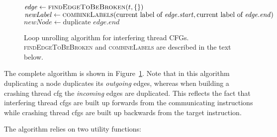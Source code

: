 \begin{figure}
\begin{algorithmic}
       \State $\mathit{edge} \gets \textsc{findEdgeToBeBroken}(t, \{\})$
       \State $\mathit{newLabel} \gets \textsc{combineLabels}(\text{current label of } \mathit{edge}.\mathit{start}, \text{current label of } \mathit{edge}.\mathit{end})$
       \Else
           \State $\mathit{newNode} \gets \text{duplicate } \mathit{edge}.\mathit{end}$
           \EndFor
       \EndIf
    \EndWhile
  \EndFor
\end{algorithmic}
\caption{Loop unrolling algorithm for interfering thread CFGs.
  \textsc{findEdgeToBeBroken} and \textsc{combineLabels} are described
  in the text below.}
\label{fig:derive:store_cfg_unroll_alg}
\end{figure}

The complete algorithm is shown in
Figure~\ref{fig:derive:store_cfg_unroll_alg}.  Note that in this
algorithm duplicating a node duplicates its \emph{outgoing} edges,
whereas when building a crashing thread \gls{cfg} the \emph{incoming} edges
are duplicated.  This reflects the fact that interfering thread \glspl{cfg}
are built up forwards from the communicating instructions while crashing
thread \glspl{cfg} are built up backwards from the target instruction.

The algorithm relies on two utility functions:

